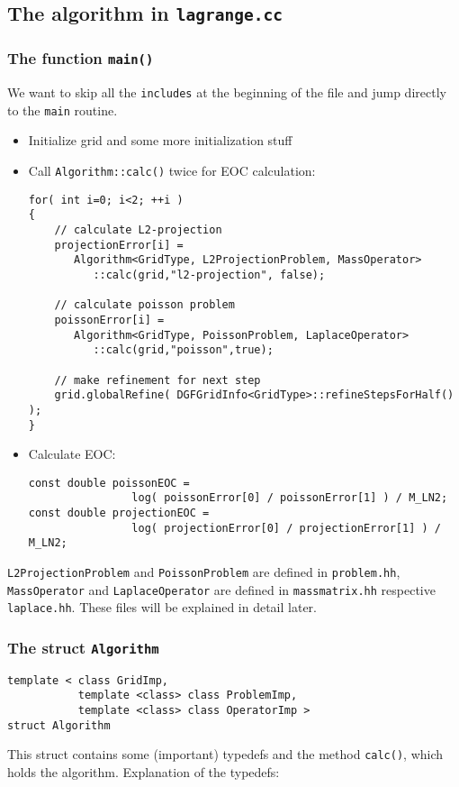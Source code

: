\subsection{The algorithm in \texttt{lagrange.cc} }
\subsubsection{The function \texttt{main()} }
We want to skip all the \texttt{includes} at the beginning of the file and jump directly to the \texttt{main} routine.

\begin{itemize}
 \item Initialize grid and some more initialization stuff

 \item Call \texttt{Algorithm::calc()} twice for EOC calculation:
\begin{lstlisting}
for( int i=0; i<2; ++i )
{
	// calculate L2-projection
	projectionError[i] =
       Algorithm<GridType, L2ProjectionProblem, MassOperator>
          ::calc(grid,"l2-projection", false);

	// calculate poisson problem
	poissonError[i] =
       Algorithm<GridType, PoissonProblem, LaplaceOperator>
          ::calc(grid,"poisson",true);

	// make refinement for next step
	grid.globalRefine( DGFGridInfo<GridType>::refineStepsForHalf() );
}
\end{lstlisting}

 \item Calculate EOC:
\begin{lstlisting}
const double poissonEOC =
                log( poissonError[0] / poissonError[1] ) / M_LN2;
const double projectionEOC =
                log( projectionError[0] / projectionError[1] ) / M_LN2;
\end{lstlisting}

\end{itemize}
\texttt{L2ProjectionProblem} and \texttt{PoissonProblem} are defined in \texttt{problem.hh},
\texttt{MassOperator} and \texttt{LaplaceOperator} are defined in \texttt{massmatrix.hh} respective \texttt{laplace.hh}. These files will be explained in detail later.


\subsubsection{The struct \texttt{Algorithm} }
\begin{lstlisting}
template < class GridImp,
           template <class> class ProblemImp,
           template <class> class OperatorImp >
struct Algorithm
\end{lstlisting}
This struct contains some (important) typedefs and the method \texttt{calc()}, which holds the algorithm.
Explanation of the typedefs:

